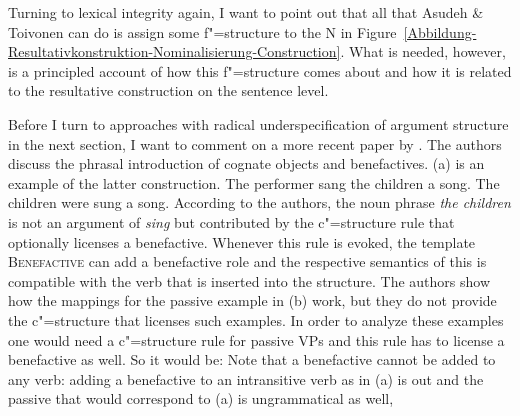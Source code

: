 Turning to lexical integrity again, I want to point out that all that Asudeh \& Toivonen can do is
assign some f"=structure to the N in
Figure~\ref{Abbildung-Resultativkonstruktion-Nominalisierung-Construction}. What is needed, however,
is a principled account of how this f"=structure comes about and how it is related to the
resultative construction on the sentence level.

Before I turn to approaches with radical underspecification of argument structure in the next
section, I want to comment on a more recent paper by \citet*{AGT2014a}. The authors discuss the
phrasal introduction of cognate objects and benefactives. (a) is an example of the latter construction. 
\eal
\ex The performer sang the children a song.
\ex The children were sung a song. 
\zl
According to the authors, the noun phrase \emph{the children} is not an argument of \emph{sing} but
contributed by the c"=structure rule that optionally licenses a benefactive.
\ea\label{c-struc-vp-benefactive}
\z
Whenever this rule is evoked, the template \textsc{Benefactive} can add a benefactive role and the
respective semantics of this is compatible with the verb that is inserted into the structure. The
authors show how the mappings for the passive example in (b) work, but they do not provide
the c"=structure that licenses such examples. In order to analyze these examples one would need a
c"=structure rule for passive VPs and this rule has to license a benefactive as well. So it would
be:
\ea\label{c-struc-vp-benefactive-passive}
\z
Note that a benefactive cannot be added to any verb: adding a benefactive to an intransitive verb as
in (a) is out and the passive that would correspond to (a) is ungrammatical as well,

